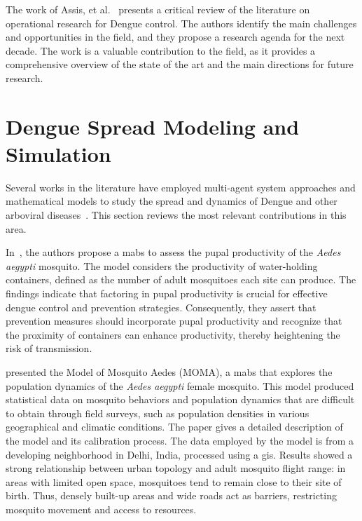 The work of Assis, et al.~\cite{assis:2024} presents a critical review of the
literature on operational research for Dengue control. The authors identify
the main challenges and opportunities in the field, and they propose a research
agenda for the next decade. The work is a valuable contribution to the field,
as it provides a comprehensive overview of the state of the art and the main
directions for future research. 

\section{Dengue Spread Modeling and Simulation}\label{sec:dengue-spread-simulation}

Several works in the literature have employed multi-agent system approaches and mathematical models to study the spread and dynamics of Dengue and other arboviral diseases~\cite{amouroux:2008,damien:2017,da-silva:2020}. This section reviews the most relevant contributions in this area.

In~\cite{Borges2015}, the authors propose a \gls{mabs} to assess the pupal
productivity of the \textit{Aedes aegypti} mosquito. The model considers the
productivity of water-holding containers, defined as the number of adult
mosquitoes each site can produce. The findings indicate that factoring in pupal
productivity is crucial for effective dengue control and prevention strategies.
Consequently, they assert that prevention measures should incorporate pupal
productivity and recognize that the proximity of containers can enhance
productivity, thereby heightening the risk of transmission.

\cite{maneerat:2016} presented the Model of Mosquito Aedes (MOMA), a \gls{mabs}
that explores the population dynamics of the \textit{Aedes aegypti} female
mosquito. This model produced statistical data on mosquito behaviors and
population dynamics that are difficult to obtain through field surveys, such as
population densities in various geographical and climatic conditions. The paper
gives a detailed description of the model and its calibration process. The data
employed by the model is from a developing neighborhood in Delhi, India,
processed using a \gls{gis}. Results showed a strong relationship between urban
topology and adult mosquito flight range: in areas with limited open space,
mosquitoes tend to remain close to their site of birth. Thus, densely built-up
areas and wide roads act as barriers, restricting mosquito movement and access
to resources.

